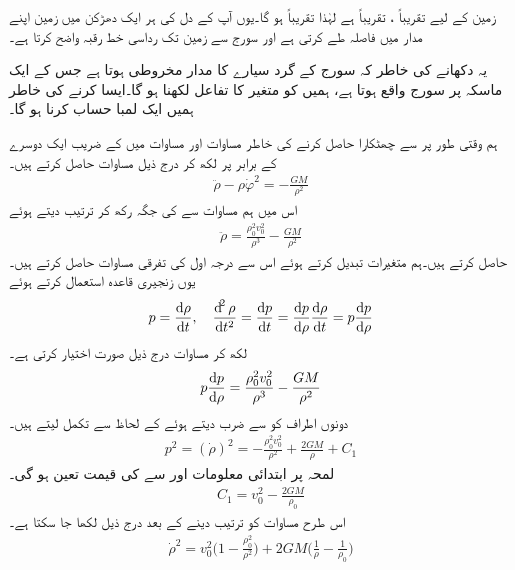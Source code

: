 زمین کے لیے    تقریباً    ،  تقریباً   ہے لہٰذا تقریباً  ہو گا۔یوں آپ کے دل کی ہر ایک  دھڑکن میں  زمین اپنے مدار میں   فاصلہ طے کرتی ہے اور سورج سے زمین تک رداسی خط  رقبہ واضح کرتا ہے۔ 

یہ دکھانے کی خاطر کہ سورج کے گرد سیارے  کا  مدار مخروطی ہوتا ہے   جس کے ایک ماسکہ پر سورج واقع ہوتا ہے، ہمیں  کو متغیر  کا تفاعل لکھنا ہو گا۔ایسا کرنے کی خاطر ہمیں ایک لمبا حساب کرنا ہو گا۔ 

ہم وقتی طور پر  سے چھٹکارا حاصل کرنے کی خاطر   مساوات  اور مساوات  میں  کے  ضریب  ایک دوسرے کے برابر پر لکھ کر درج ذیل مساوات حاصل کرتے ہیں۔
\begin{align}\label{مساوات_سمتی_تفاعل_کپلر_ثبوت_پہلا_الف}
\ddot{\rho}-\rho\dot{\varphi}^2=-\frac{GM}{\rho^2}
\end{align}
اس میں ہم  مساوات  سے   کی جگہ    رکھ کر  ترتیب دیتے  ہوئے
\begin{align}\label{مساوات_سمتی_تفاعل_کپلر_ثبوت_پہلا_ب}
\ddot{\rho}=\frac{\rho_0^2v_0^2}{\rho^3}-\frac{GM}{\rho^2}
\end{align}
حاصل کرتے ہیں۔ہم متغیرات تبدیل کرتے ہوئے اس سے درجہ اول کی تفرقی مساوات حاصل کرتے ہیں۔یوں زنجیری قاعدہ  استعمال کرتے ہوئے
\begin{align*}
p=\frac{\dif \rho}{\dif t},\quad \frac{\dif^2 \rho}{\dif t^2}=\frac{\dif p}{\dif t}=\frac{\dif p}{\dif \rho}\frac{\dif \rho}{\dif t}=p\frac{\dif p}{\dif \rho}
\end{align*}
لکھ کر مساوات   درج  ذیل صورت اختیار کرتی ہے۔
\begin{align}\label{مساوات_سمتی_تفاعل_کپلر_ثبوت_پہلا_پ}
p\frac{\dif p}{\dif \rho}=\frac{\rho_0^2v_0^2}{\rho^3}-\frac{GM}{\rho^2}
\end{align}
دونوں اطراف کو  سے ضرب دیتے ہوئے  کے لحاظ سے تکمل لیتے ہیں۔
\begin{align}\label{مساوات_سمتی_تفاعل_کپلر_ثبوت_پہلا_ت}
p^2=(\dot{\rho})^2=-\frac{\rho_0^2v_0^2}{\rho^2}+\frac{2GM}{\rho}+C_1
\end{align}
لمحہ  پر ابتدائی معلومات  اور   سے  کی قیمت تعین ہو گی۔
\begin{align*}
C_1=v_0^2-\frac{2GM}{\rho_0}
\end{align*}
اس طرح مساوات   کو ترتیب دینے کے بعد درج ذیل لکھا جا سکتا ہے۔
\begin{align}\label{مساوات_سمتی_تفاعل_کپلر_ثبوت_پہلا_ٹ}
\dot{\rho}^2=v_0^2\big(1-\frac{\rho_0^2}{\rho^2}\big)+2GM\big(\frac{1}{\rho}-\frac{1}{\rho_0}\big)
\end{align}

